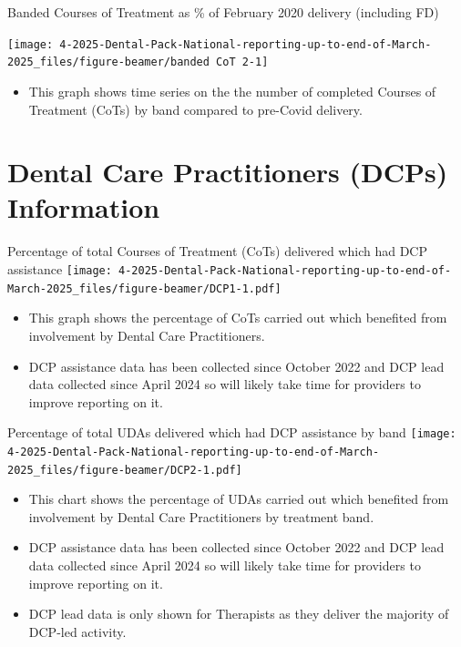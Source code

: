 \documentclass[
  8pt,
  ignorenonframetext,
  aspectratio = 169]{beamer}
\providecommand{\tightlist}{%
  \setlength{\itemsep}{0pt}\setlength{\parskip}{0pt}}
\begin{document}
\begin{frame}{Banded Courses of Treatment as \% of February 2020
delivery (including FD)}
\protect\hypertarget{banded-courses-of-treatment-as-of-february-2020-delivery-including-fd}{}
\begin{center}\texttt{[image: 4-2025-Dental-Pack-National-reporting-up-to-end-of-March-2025\_files/figure-beamer/banded CoT 2-1]} \end{center}

\begin{itemize}
\tightlist
\item
  This graph shows time series on the the number of completed Courses of
  Treatment (CoTs) by band compared to pre-Covid delivery.
\end{itemize}
\end{frame}

\hypertarget{dental-care-practitioners-dcps-information}{%
\section{Dental Care Practitioners (DCPs)
Information}\label{dental-care-practitioners-dcps-information}}

\begin{frame}{Percentage of total Courses of Treatment (CoTs) delivered
which had DCP assistance}
\protect\hypertarget{percentage-of-total-courses-of-treatment-cots-delivered-which-had-dcp-assistance}{}
\texttt{[image: 4-2025-Dental-Pack-National-reporting-up-to-end-of-March-2025\_files/figure-beamer/DCP1-1.pdf]}

\begin{itemize}
\tightlist
\item
  This graph shows the percentage of CoTs carried out which benefited
  from involvement by Dental Care Practitioners.
\item
  DCP assistance data has been collected since October 2022 and DCP lead
  data collected since April 2024 so will likely take time for providers
  to improve reporting on it.
\end{itemize}
\end{frame}

\begin{frame}{Percentage of total UDAs delivered which had DCP
assistance by band}
\protect\hypertarget{percentage-of-total-udas-delivered-which-had-dcp-assistance-by-band}{}
\texttt{[image: 4-2025-Dental-Pack-National-reporting-up-to-end-of-March-2025\_files/figure-beamer/DCP2-1.pdf]}

\begin{itemize}
\tightlist
\item
  This chart shows the percentage of UDAs carried out which benefited
  from involvement by Dental Care Practitioners by treatment band.
\item
  DCP assistance data has been collected since October 2022 and DCP lead
  data collected since April 2024 so will likely take time for providers
  to improve reporting on it.
\item
  DCP lead data is only shown for Therapists as they deliver the
  majority of DCP-led activity.
\end{itemize}
\end{frame}
\end{document}

